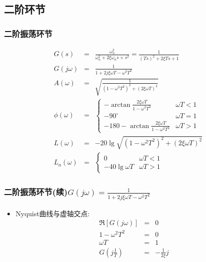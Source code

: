 \documentclass[table]{article}
\begin{document}
\subsection{二阶环节}
\label{sec-2-3}
\begin{frame}
\frametitle{二阶振荡环节}
\label{sec-2-3-1}

\begin{eqnarray*}
G(s) & = & \frac{\omega_n^2}{\omega_n^2 +2\xi\omega_n s + s^2}
       =   \frac{1}{(Ts)^2+2\xi Ts+1} \\
G(j\omega) & =& \frac{1}{1+2j\xi\omega T-\omega^2 T^2}\\
A(\omega) &=& \sqrt{\frac{1}{(1-\omega^2 T^2)^2+(2\xi\omega T)^2}}\\
\phi(\omega) &=& 
\begin{cases}
-\arctan\frac{2\xi\omega T}{1-\omega^2 T^2} & \omega T <1 \\
-90^{\circ} & \omega T =1 \\
-180-\arctan\frac{2\xi\omega T}{1-\omega^2 T^2} & \omega T >1 
\end{cases} \\
L(\omega)&=& -20\lg\sqrt{(1-\omega^2 T^2)^2+(2\xi\omega T)^2}\\
L_a(\omega)&=& 
\begin{cases} 0 & \omega T<1 \\ 
-40\lg\omega T & \omega T>1
\end{cases}
\end{eqnarray*}
\end{frame}
\begin{frame}
\frametitle{二阶振荡环节(续)$G(j\omega) = \frac{1}{1+2j\xi\omega T-\omega^2 T^2}$}
\label{sec-2-3-2}

\begin{itemize}
\item Nyquist曲线与虚轴交点:
      \begin{eqnarray*}
      \Re[G(j\omega)] &=& 0\\
      1-\omega^2 T^2 &=& 0\\
      \omega T &=&1\\
      G(j\frac{1}{T})&=&-\frac{1}{2\xi}j
      \end{eqnarray*}
\end{itemize}
\end{frame}
\end{document}
